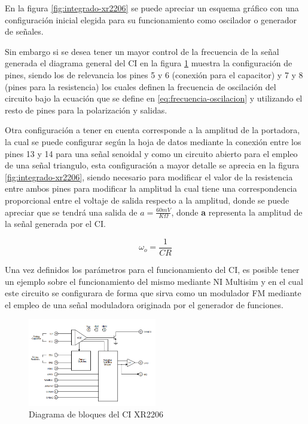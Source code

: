 \documentclass[conference]{IEEEtran}
\begin{document}
	En la figura \ref{fig:integrado-xr2206} se puede apreciar un esquema gráfico con una configuración inicial elegida para su funcionamiento como oscilador o generador de señales.
	
	Sin embargo si se desea tener un mayor control de la frecuencia de la señal generada el diagrama general del CI en la figura \ref{fig:diagrama-bloques-xr2206} muestra la configuración de pines, siendo los de relevancia los pines 5 y 6 (conexión para el capacitor) y 7 y 8 (pines para la resistencia) los cuales definen la frecuencia de oscilación del circuito bajo la ecuación que se define en \ref{eq:frecuencia-oscilacion} y utilizando el resto de pines para la polarización y salidas.
	
	Otra configuración a tener en cuenta corresponde a la amplitud de la portadora, la cual se puede configurar según la hoja de datos mediante la conexión entre los pines 13 y 14 para una señal senoidal y como un circuito abierto para el empleo de una señal triangulo, esta configuración a mayor detalle se aprecia en la figura \ref{fig:integrado-xr2206}, siendo necesario para modificar el valor de la resistencia entre ambos pines para modificar la amplitud la cual tiene una correspondencia proporcional entre el voltaje de salida respecto a la amplitud, donde se puede apreciar que se tendrá una salida de $a = \frac{60mV}{K\Omega}$, donde \textbf{a} representa la amplitud de la señal generada por el CI.
	
	\begin{equation}
		\omega_o = \frac{1}{CR}
		\label{eq:frecuencia-oscilacion}
	\end{equation}
	
	
	Una vez definidos los parámetros para el funcionamiento del CI, es posible tener un ejemplo sobre el funcionamiento del mismo mediante NI Multisim y en el cual este circuito se configurara de forma que sirva como un modulador FM mediante el empleo de una señal moduladora originada por el generador de funciones.
	
	\begin{figure}[h]
		\centering
		\includegraphics[width=0.5\textwidth]{media/diagrama-bloques-xr2206}
		\caption{Diagrama de bloques del CI XR2206}
		\label{fig:diagrama-bloques-xr2206}
	\end{figure}
	
\end{document}
